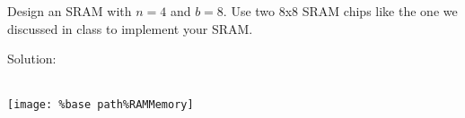 Design an SRAM with $n=4$ and $b=8$.  Use two 8x8 SRAM chips like the one we discussed in class to implement your SRAM.

Solution: \\ \\
\begin{center}
  \texttt{[image: \%base path\%RAMMemory]}
\end{center}
